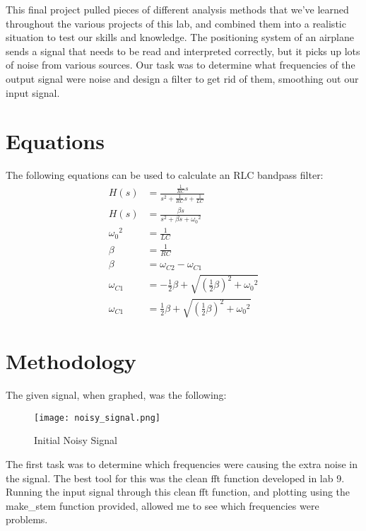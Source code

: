 \documentclass[12pt]{report}
\begin{document}
This final project pulled pieces of different analysis methods that we've learned throughout the various projects of this lab, and combined them into a realistic situation to test our skills and knowledge. The positioning system of an airplane sends a signal that needs to be read and interpreted correctly, but it picks up lots of noise from various sources. Our task was to determine what frequencies of the output signal were noise and design a filter to get rid of them, smoothing out our input signal.

\section{Equations}

The following equations can be used to calculate an RLC bandpass filter:
\begin{align*}
    H(s) &= \frac{\frac{1}{RC}s}{s^2+\frac{1}{RC}s+\frac{1}{LC}} \\
    H(s) &= \frac{\beta s}{s^2+\beta s+{\omega_0}^2} \\
    {\omega_0}^2 &= \frac{1}{LC} \\
    \beta &= \frac{1}{RC} \\
    \beta &= \omega_{C2}-\omega_{C1} \\
    \omega_{C1} &= -\frac{1}{2}\beta +\sqrt{\left(\frac{1}{2}\beta\right)^2+{\omega_0}^2} \\
    \omega_{C1} &= \frac{1}{2}\beta +\sqrt{\left(\frac{1}{2}\beta\right)^2+{\omega_0}^2}
\end{align*}

\newpage
 \section{Methodology}

The given signal, when graphed, was the following:
\begin{figure}[H]
    \centering
    \texttt{[image: noisy\_signal.png]}
    \caption{Initial Noisy Signal}
\end{figure}

The first task was to determine which frequencies were causing the extra noise in the signal. The best tool for this was the clean fft function developed in lab 9. Running the input signal through this clean fft function, and plotting using the make\_stem function provided, allowed me to see which frequencies were problems.
\end{document}
